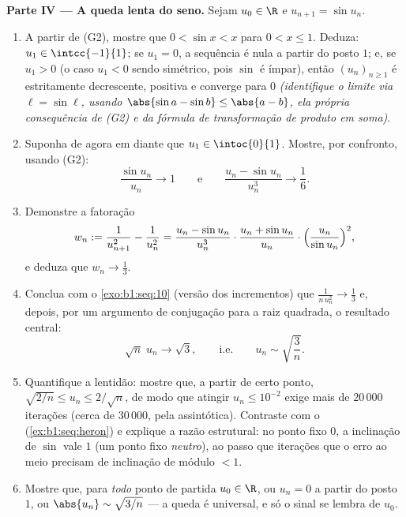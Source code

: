 \begin{problem}[{Problema de fim de semana --- o teorema de Cesàro--Stolz
e a assintótica $u_n \sim \sqrt{3/n}$ para $u_{n+1} = \sin
u_n$}]
\medskip
\noindent\textbf{Parte IV --- A queda lenta do seno.} Sejam
$u_0 \in \R$ e $u_{n+1} = \sin u_n$.
\begin{enumerate}
  \item A partir de (G2), mostre que $0 < \sin x < x$ para $0 < x \leq 1$.
        Deduza: $u_1 \in \intcc{-1}{1}$; se $u_1 = 0$, a
        sequência é nula a partir do posto $1$; e, se $u_1 > 0$ (o
        caso $u_1 < 0$ sendo simétrico, pois $\sin$ é ímpar), então
        $(u_n)_{n \geq 1}$ é estritamente decrescente, positiva e
        converge para $0$ \emph{(identifique o limite via $\ell =
        \sin \ell$, usando $\abs{\sin a - \sin b} \leq \abs{a -
        b}$, ela própria consequência de (G2) e da fórmula de
        transformação de produto em soma)}.
  \item Suponha de agora em diante que $u_1 \in \intoc{0}{1}$. Mostre, por
        confronto, usando (G2):
        \[
        \frac{\sin u_n}{u_n} \to 1
        \qquad\text{e}\qquad
        \frac{u_n - \sin u_n}{u_n^{3}} \to \frac16 .
        \]
  \item Demonstre a fatoração
        \[
        w_n := \frac{1}{u_{n+1}^{2}} - \frac{1}{u_n^{2}}
        = \frac{u_n - \sin u_n}{u_n^{3}} \cdot
        \frac{u_n + \sin u_n}{u_n} \cdot
        \Bigl(\frac{u_n}{\sin u_n}\Bigr)^{2},
        \]
        e deduza que $w_n \to \frac13$.
  \item Conclua com o \cref{exo:b1:seq:10} (versão dos incrementos)
        que $\frac{1}{n\,u_n^{2}} \to \frac13$ e, depois, por um
        argumento de conjugação para a raiz quadrada, o resultado
        central:
        \[
        \sqrt n\;u_n \longrightarrow \sqrt 3 ,
        \qquad\text{i.e.}\qquad
        u_n \sim \sqrt{\frac 3n} .
        \]
  \item Quantifique a lentidão: mostre que, a partir de certo ponto, $\sqrt{2/n}
        \leq u_n \leq 2/\sqrt n$, de modo que atingir $u_n \leq
        10^{-2}$ exige mais de $20\,000$ iterações (cerca de
        $30\,000$, pela assintótica). Contraste com o 
        (\cref{ex:b1:seq:heron}) e explique a razão
        estrutural: no ponto fixo $0$, a inclinação de
        $\sin$ vale $1$ (um ponto fixo \emph{neutro}), ao passo que
        iterações que  o erro ao meio precisam de inclinação de
        módulo $< 1$.
  \item Mostre que, para \emph{todo} ponto de partida $u_0 \in \R$,
        ou $u_n = 0$ a partir do posto $1$, ou $\abs{u_n} \sim
        \sqrt{3/n}$ --- a queda é universal, e só o sinal
        se lembra de $u_0$.
\end{enumerate}


\end{problem}
